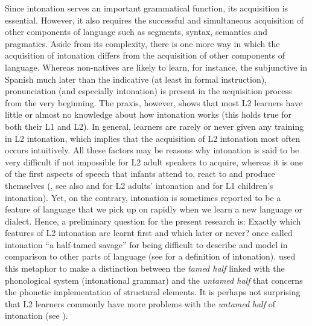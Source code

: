 Since intonation serves an important grammatical function, its acquisition is essential. However, it also requires the successful and simultaneous acquisition of other components of language such as segments, syntax, semantics and pragmatics. Aside from its complexity, there is one more way in which the acquisition of intonation differs from the acquisition of other components of language. Whereas non-natives are likely to learn, for instance, the subjunctive in Spanish much later than the indicative (at least in formal instruction), pronunciation (and especially intonation) is present in the acquisition process from the very beginning. The praxis, however, shows that most L2 learners have little or almost no knowledge about how intonation works (this holds true for both their L1 and L2). In general, learners are rarely or never given any training in L2 intonation, which implies that the acquisition of L2 intonation most often occurs intuitively. All these factors may be reasons why intonation is said to be very difficult if not impossible for L2 adult speakers to acquire, whereas it is one of the first aspects of speech that infants attend to, react to and produce themselves (\citealt[74]{Chun1998}, see also \citealt{Grosser1993} and \citealt{Chun2002} for L2 adults’ intonation and \citealt{Snow1998,Snow2006, PrietoEsteve-Gibert2018} for L1 children’s intonation). Yet, on the contrary, intonation is sometimes reported to be a feature of language that we pick up on rapidly when we learn a new language or dialect. Hence, a preliminary question for the present research is: Exactly which features of L2 intonation are learnt first and which later or never? \citet{Bolinger1978} once called intonation “a half-tamed savage” for being difficult to describe and model in comparison to other parts of language (see  for a definition of intonation). \citet[50]{Gussenhoven2004} used this metaphor to make a distinction between the \textit{tamed half} linked with the phonological system (intonational grammar) and the \textit{untamed half} that concerns the phonetic implementation of structural elements. It is perhaps not surprising that L2 learners commonly have more problems with the \textit{untamed} \textit{half} of intonation (see ).



